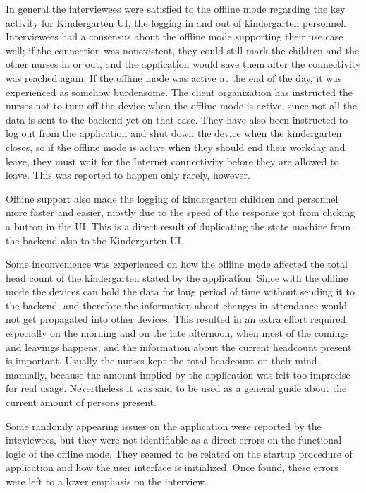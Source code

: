 In general the interviewees were satisfied to the offline mode regarding the key activity for Kindergarten UI, the logging in and out of kindergarten personnel. Interviewees had a consensus about the offline mode supporting their use case well; if the connection was nonexistent, they could still mark the children and the other nurses in or out, and the application would save them after the connectivity was reached again. If the offline mode was active at the end of the day, it was experienced as somehow burdensome. The client organization has instructed the nurses not to turn off the device when the offline mode is active, since not all the data is sent to the backend yet on that case. They have also been instructed to log out from the application and shut down the device when the kindergarten closes, so if the offline mode is active when they should end their workday and leave, they must wait for the Internet connectivity before they are allowed to leave. This was reported to happen only rarely, however.

Offline support also made the logging of kindergarten children and personnel more faster and easier, mostly due to the speed of the response got from clicking a button in the UI. This is a direct result of duplicating the state machine from the backend also to the Kindergarten UI. 

Some inconvenience was experienced on how the offline mode affected the total head count of the kindergarten stated by the application. Since with the offline mode the devices can hold the data for long period of time without sending it to the backend, and therefore the information about changes in attendance would not get propagated into other devices. This resulted in an extra effort required especially on the morning and on the late afternoon, when most of the comings and leavings happens, and the information about the current headcount present is important. Usually the nurses kept the total headcount on their mind manually, because the amount implied by the application was felt too imprecise for real usage. Nevertheless it was said to be used as a general guide about the current amount of persons present.

Some randomly appearing issues on the application were reported by the inteviewees, but they were not identifiable as a direct errors on the functional logic of the offline mode. They seemed to be related on the startup procedure of application and how the user interface is initialized. Once found, these errors were left to a lower emphasis on the interview.

